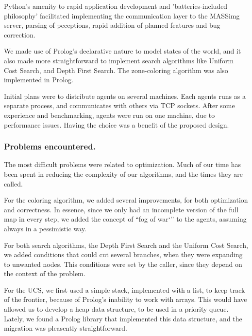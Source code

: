 \documentclass{llncs2e/llncs}
\begin{document}
    Python's amenity to rapid application development and 'batteries-included 
    philosophy' facilitated implementing the communication layer to the MASSimg 
    server, parsing of peceptions, rapid addition of planned features and bug 
    correction.

    We made use of Prolog's declarative nature to model states of the world, and it 
    also made more straightforward to implement search algorithms like Uniform Cost 
    Search, and Depth First Search. The zone-coloring algorithm was also 
    implemented in Prolog.
    
    
    Initial plans were to distribute agents on several machines. Each agents runs 
    as a separate process, and communicates with others via TCP sockets. After 
    some experience and benchmarking, agents were run on one machine, due to 
    performance issues. 
    Having the choice was a benefit of the proposed design.

\subsubsection{Problems encountered.}

    The most difficult problems were related to optimization. Much of our time has 
    been spent in reducing the complexity of our algorithms, and the times they 
    are called.

    For the coloring algorithm, we added several improvements, for both 
    optimization and correctness. In essence, since we only had an incomplete 
    version of the full map in every step, we added the concept of ``fog of war`'' 
    to the agents, assuming always in a pessimistic way. 

    For both search algorithms, the Depth First Search and the Uniform Cost 
    Search, we added conditions that could cut several branches, when they were 
    expanding to unwanted nodes. This conditions were set by the caller, since 
    they depend on the context of the problem.

    For the UCS, we first used a simple stack, implemented with a list, to keep 
    track of the frontier, because of Prolog's inability to work with arrays. This 
    would have allowed us to develop a heap data structure, to be used in a 
    priority queue. Lately, we found a Prolog library that implemented this data 
    structure, and the migration was pleasently straightforward.
\end{document}
